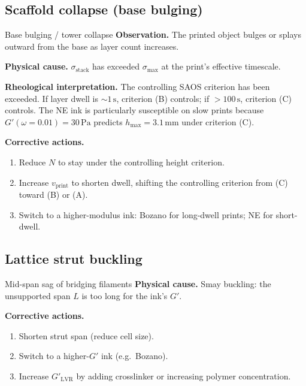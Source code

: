 \documentclass[11pt,a4paper]{article}
\begin{document}
\subsection{Scaffold collapse (base bulging)}

\begin{failurebox}{Base bulging / tower collapse}
\textbf{Observation.} The printed object bulges or splays outward from
the base as layer count increases.

\textbf{Physical cause.} $\sigma_\mathrm{stack}$ has exceeded
$\sigma_\mathrm{max}$ at the print's effective timescale.

\textbf{Rheological interpretation.} The controlling SAOS criterion
has been exceeded. If layer dwell is $\sim 1\,\si{\s}$, criterion (B)
controls; if $>100\,\si{\s}$, criterion (C) controls. The NE ink is
particularly susceptible on slow prints because $G'(\omega=0.01)=30\,\si{\Pa}$
predicts $h_\mathrm{max}=3.1\,\si{\mm}$ under criterion (C).

\textbf{Corrective actions.}
\begin{enumerate}[leftmargin=1.6em,itemsep=1pt]
\item Reduce $N$ to stay under the controlling height criterion.
\item Increase $v_\mathrm{print}$ to shorten dwell, shifting the
  controlling criterion from (C) toward (B) or (A).
\item Switch to a higher-modulus ink: Bozano for long-dwell prints;
  NE for short-dwell.
\end{enumerate}
\end{failurebox}

\subsection{Lattice strut buckling}

\begin{failurebox}{Mid-span sag of bridging filaments}
\textbf{Physical cause.} Smay buckling: the unsupported span $L$ is
too long for the ink's $G'$.

\textbf{Corrective actions.}
\begin{enumerate}[leftmargin=1.6em,itemsep=1pt]
\item Shorten strut span (reduce cell size).
\item Switch to a higher-$G'$ ink (e.g.\ Bozano).
\item Increase $G'_\mathrm{LVR}$ by adding crosslinker or increasing
  polymer concentration.
\end{enumerate}
\end{failurebox}
\end{document}
